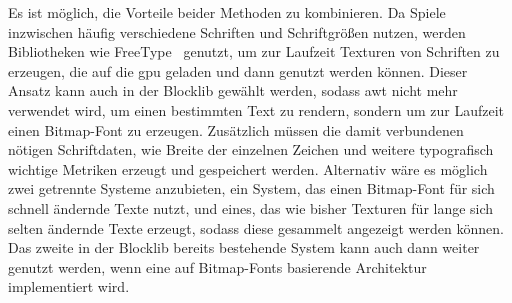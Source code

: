 Es ist möglich, die Vorteile beider Methoden zu kombinieren. Da Spiele inzwischen häufig verschiedene Schriften und Schriftgrößen nutzen, werden Bibliotheken wie FreeType~\cite{TheFreeTypeProject,Vries2020} genutzt, um zur Laufzeit Texturen von Schriften zu erzeugen, die auf die \ac{gpu} geladen und dann genutzt werden können. Dieser Ansatz kann auch in der Blocklib gewählt werden, sodass \ac{awt} nicht mehr verwendet wird, um einen bestimmten Text zu rendern, sondern um zur Laufzeit einen Bitmap-Font zu erzeugen. Zusätzlich müssen die damit verbundenen nötigen Schriftdaten, wie Breite der einzelnen Zeichen und weitere typografisch wichtige Metriken erzeugt und gespeichert werden. Alternativ wäre es möglich zwei getrennte Systeme anzubieten, ein System, das einen Bitmap-Font für sich schnell ändernde Texte nutzt, und eines, das wie bisher Texturen für lange sich selten ändernde Texte erzeugt, sodass diese gesammelt angezeigt werden können. Das zweite in der Blocklib bereits bestehende System kann auch dann weiter genutzt werden, wenn eine auf Bitmap-Fonts basierende Architektur implementiert wird.
